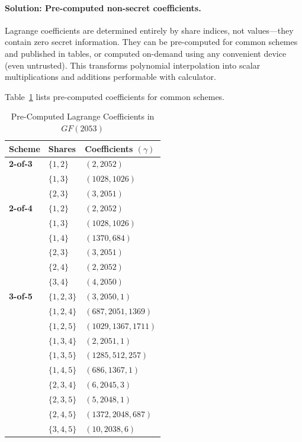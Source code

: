 \documentclass[11pt]{article}
\begin{document}
\paragraph{Solution: Pre-computed non-secret coefficients.} Lagrange coefficients are determined entirely by share indices, not values—they contain zero secret information. They can be pre-computed for common schemes and published in tables, or computed on-demand using any convenient device (even untrusted). This transforms polynomial interpolation into scalar multiplications and additions performable with calculator.

Table~\ref{tab:coefficients} lists pre-computed coefficients for common schemes.

\begin{table}[t]
\centering
\caption{Pre-Computed Lagrange Coefficients in $GF(2053)$}
\label{tab:coefficients}
\small
\begin{tabular}{@{}llp{4cm}@{}}
\toprule
\textbf{Scheme} & \textbf{Shares} & \textbf{Coefficients $(\gamma)$} \\ \midrule
\textbf{2-of-3} & $\{1, 2\}$ & $(2, 2052)$ \\
                & $\{1, 3\}$ & $(1028, 1026)$ \\
                & $\{2, 3\}$ & $(3, 2051)$ \\ \midrule
\textbf{2-of-4} & $\{1, 2\}$ & $(2, 2052)$ \\
                & $\{1, 3\}$ & $(1028, 1026)$ \\
                & $\{1, 4\}$ & $(1370, 684)$ \\
                & $\{2, 3\}$ & $(3, 2051)$ \\
                & $\{2, 4\}$ & $(2, 2052)$ \\
                & $\{3, 4\}$ & $(4, 2050)$ \\ \midrule
\textbf{3-of-5} & $\{1, 2, 3\}$ & $(3, 2050, 1)$ \\
                & $\{1, 2, 4\}$ & $(687, 2051, 1369)$ \\
                & $\{1, 2, 5\}$ & $(1029, 1367, 1711)$ \\
                & $\{1, 3, 4\}$ & $(2, 2051, 1)$ \\
                & $\{1, 3, 5\}$ & $(1285, 512, 257)$ \\
                & $\{1, 4, 5\}$ & $(686, 1367, 1)$ \\
                & $\{2, 3, 4\}$ & $(6, 2045, 3)$ \\
                & $\{2, 3, 5\}$ & $(5, 2048, 1)$ \\
                & $\{2, 4, 5\}$ & $(1372, 2048, 687)$ \\
                & $\{3, 4, 5\}$ & $(10, 2038, 6)$ \\
\bottomrule
\end{tabular}
\end{table}
\end{document}
